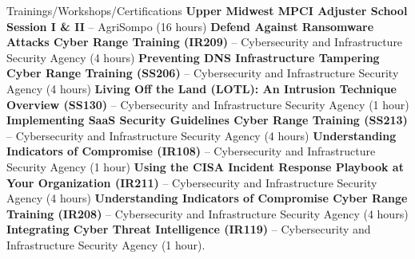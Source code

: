 \begin{rubric}{Trainings/Workshops/Certifications}
%
    \entry*[04/02/2026] \textbf{Upper Midwest MPCI Adjuster School Session I \& II} -- AgriSompo (16 hours) \href{https://github.com/amantaya/curriculum-vitae/blob/master/certifications/2026-Claims-Adjuster-School-FCIC-Fargo.pdf}{\scriptsize\faLink}
%
    \entry*[8/19/2025] \textbf{Defend Against Ransomware Attacks Cyber Range Training (IR209)} -- Cybersecurity and Infrastructure Security Agency (4 hours) \href{https://github.com/amantaya/curriculum-vitae/blob/master/certifications/IR209_Aug19_2025_Course_Completion_Certificate.pdf}{\scriptsize\faLink}
%
    \entry*[7/24/2025] \textbf{Preventing DNS Infrastructure Tampering Cyber Range Training (SS206)} -- Cybersecurity and Infrastructure Security Agency (4 hours) \href{https://github.com/amantaya/curriculum-vitae/blob/master/certifications/SS206_Course_Completion_Certificate.pdf}{\scriptsize\faLink}
%
    \entry*[7/22/2025] \textbf{Living Off the Land (LOTL): An Intrusion Technique Overview (SS130)} -- Cybersecurity and Infrastructure Security Agency (1 hour)
%
    \entry*[7/17/2025] \textbf{Implementing SaaS Security Guidelines Cyber Range Training (SS213)} -- Cybersecurity and Infrastructure Security Agency (4 hours) \href{https://github.com/amantaya/curriculum-vitae/blob/master/certifications/SS213_Course_Completion_Certificate.pdf}{\scriptsize\faLink}
%
    \entry*[7/03/2025] \textbf{Understanding Indicators of Compromise (IR108)} -- Cybersecurity and Infrastructure Security Agency (1 hour) \href{https://github.com/amantaya/curriculum-vitae/blob/master/certifications/IR108_JUL2-2025_CertificateofAttendance.pdf}{\scriptsize\faLink}
%
    \entry*[6/24/2025] \textbf{Using the CISA Incident Response Playbook at Your Organization (IR211)} -- Cybersecurity and Infrastructure Security Agency (4 hours) \href{https://github.com/amantaya/curriculum-vitae/blob/master/certifications/IR211_JUN24-2025_CertificateofAttendance.pdf}{\scriptsize\faLink}
%
    \entry*[6/10/2025] \textbf{Understanding Indicators of Compromise Cyber Range Training (IR208)} -- Cybersecurity and Infrastructure Security Agency (4 hours) \href{https://github.com/amantaya/curriculum-vitae/blob/master/certifications/IR208_June10_2025_Course_Completion_Certificate.pdf}{\scriptsize\faLink}
%
    \entry*[6/09/2025] \textbf{Integrating Cyber Threat Intelligence (IR119)} -- Cybersecurity and Infrastructure Security Agency (1 hour). \href{https://github.com/amantaya/curriculum-vitae/blob/master/certifications/IR119_CoC_060925%201.pdf}{\scriptsize\faLink}

\end{rubric}
